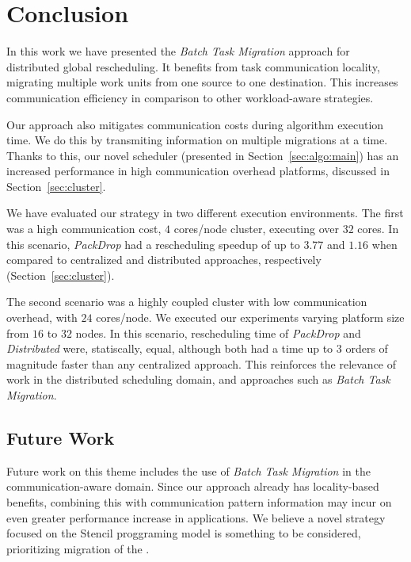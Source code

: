 \section{Conclusion} \label{sec:conclusion}

In this work we have presented the \textit{Batch Task Migration} approach for distributed global rescheduling.
It benefits from task communication locality, migrating multiple work units from one source to one destination.
This increases communication efficiency in comparison to other workload-aware strategies.

Our approach also mitigates communication costs during algorithm execution time.
We do this by transmiting information on multiple migrations at a time.
Thanks to this, our novel scheduler (presented in Section~\ref{sec:algo:main}) has an increased performance in high communication overhead platforms, discussed in Section~\ref{sec:cluster}.

We have evaluated our strategy in two different execution environments. 
The first was a high communication cost, $4$ cores/node cluster, executing over $32$ cores.
In this scenario, \textit{PackDrop} had a rescheduling speedup of up to $3.77$ and $1.16$ when compared to centralized and distributed approaches, respectively (Section~\ref{sec:cluster}).

The second scenario was a highly coupled cluster with low communication overhead, with $24$ cores/node.
We executed our experiments varying platform size from $16$ to $32$ nodes.
In this scenario, rescheduling time of \textit{PackDrop} and \textit{Distributed} were, statiscally, equal, although both had a time up to $3$ orders of magnitude faster than any centralized approach.
This reinforces the relevance of work in the distributed scheduling domain, and approaches such as \textit{Batch Task Migration}.

\subsection{Future Work}

Future work on this theme includes the use of \textit{Batch Task Migration} in the communication-aware domain.
Since our approach already has locality-based benefits, combining this with communication pattern information may incur on even greater performance increase in applications.
We believe a novel strategy focused on the Stencil proggraming model is something to be considered, prioritizing migration of the .

